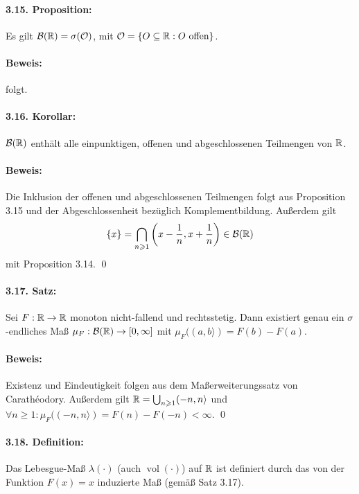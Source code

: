 \documentclass[12pt]{report}
\begin{document}
\paragraph{3.15. Proposition:}Es gilt $\mathcal{B}(\mathbb{R})=\sigma(\mathcal{O})$, mit $\mathcal{O}=\{O\subseteq\mathbb{R}:O\text{ offen}\}$.

\paragraph{Beweis:} folgt.

\paragraph{3.16. Korollar:}$\mathcal{B}(\mathbb{R})$ enth\"alt alle einpunktigen, offenen und abgeschlossenen Teilmengen von $\mathbb{R}$.

\paragraph{Beweis:}Die Inklusion der offenen und abgeschlossenen Teilmengen folgt aus Proposition 3.15 und der Abgeschlossenheit bez\"uglich Komplementbildung. \newline
Au\ss{}erdem gilt 
$$\{x\}=\bigcap_{n\geqslant1}\left(x-\frac{1}{n},x+\frac{1}{n}\right)\in\mathcal{B}(\mathbb{R})$$
mit Proposition 3.14. \qed

\paragraph{3.17. Satz:}Sei $F:\mathbb{R}\to\mathbb{R}$ monoton nicht-fallend und rechtsstetig. Dann existiert genau ein $\sigma$-endliches Ma\ss{} $\mu_F:\mathcal{B}(\mathbb{R})\to[0,\infty]$ mit $\mu_F((a,b\rangle)=F(b)-F(a)$.

\paragraph{Beweis:}Existenz und Eindeutigkeit folgen aus dem Ma\ss{}erweiterungssatz von Carath\'eodory. Au\ss{}erdem gilt $\mathbb{R}=\bigcup_{n\geqslant1}(-n,n\rangle$ und $\forall n\geq1:\mu_F((-n,n\rangle)=F(n)-F(-n)<\infty$. \qed

\paragraph{3.18. Definition:}Das Lebesgue-Ma\ss{} $\lambda(\cdot)$ (auch $\operatorname{vol}(\cdot)$) auf $\mathbb{R}$ ist definiert durch das von der Funktion $F(x)=x$ induzierte Ma\ss{} (gem\"a\ss{} Satz 3.17).
\end{document}
